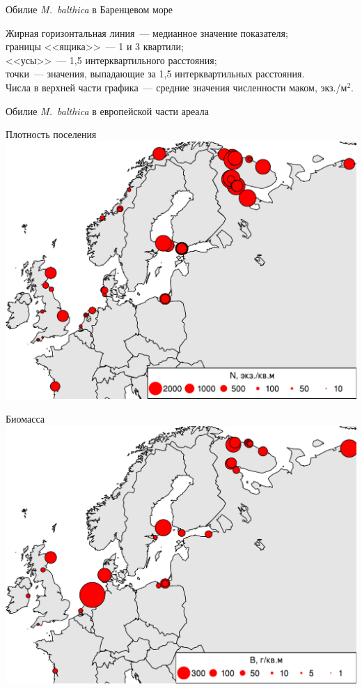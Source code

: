 \documentclass{beamer}
\begin{document}
\begin{frame}{Обилие {\it M.~balthica} в Баренцевом море}
\begin{tiny} Жирная горизонтальная линия~--- медианное значение показателя;\\
границы <<ящика>>~--- 1 и 3 квартили;\\ <<усы>>~--- 1,5 интерквартильного расстояния;\\ 
точки~--- значения, выпадающие за 1,5 интерквартильных расстояния.\\ 
Числа в верхней части графика~--- средние значения численности маком, экз./м$^2$.
\end{tiny}
\end{frame}



\begin{frame}{Обилие {\it M.~balthica} в европейской части ареала}
	\begin{minipage}[t]{.49\linewidth}
		\begin{center}
		{\footnotesize Плотность поселения}
			\includegraphics[width=\textwidth]{Nmean_ru1.pdf}
		\end{center}
	\end{minipage}
%
	\begin{minipage}[t]{.49\linewidth}
		\begin{center}
		{\footnotesize Биомасса}
			\includegraphics[width=\textwidth]{Bmean_ru1.pdf}

\end{center}
\end{minipage}
\end{frame}
\end{document}
